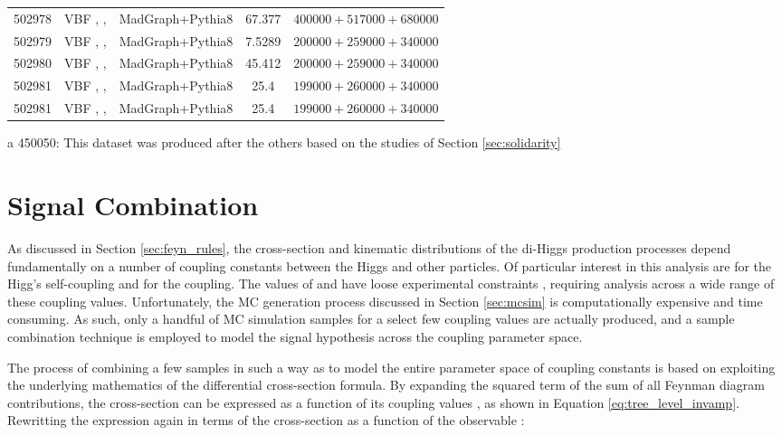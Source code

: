 \begin{table}[tbh]
\begin{center}
\begin{tabular}{lllSl}
               502978  &	VBF , ,    &  MadGraph+Pythia8 &	67.377  & $400000  +517000  +680000  $\\
               502979  &	VBF , ,   &  MadGraph+Pythia8 &	7.5289  & $200000  +259000  +340000  $\\
               502980  &	VBF , ,   &  MadGraph+Pythia8 &	45.412  & $200000  +259000  +340000  $\\
               502981  &	VBF , ,     &  MadGraph+Pythia8 &	25.4    & $199000  +260000  +340000  $\\
               502981  &	VBF , ,  &  MadGraph+Pythia8 &	25.4    & $199000  +260000  +340000  $\\ %
           \bottomrule
           \end{tabular}
           \begin{tablenotes}
            \item[a] 450050: This dataset was produced after the others based on the studies of Section \ref{sec:solidarity}
          \end{tablenotes}
       \end{center}
    \end{table}

\section{Signal Combination}

    As discussed in Section \ref{sec:feyn_rules}, the cross-section and kinematic distributions of the di-Higgs production processes depend fundamentally on a number of coupling constants between the Higgs and other particles.
    Of particular interest in this analysis are \kl for the Higg's self-coupling and \kvv for the \HHVV coupling.
    The values of \kl and \kvv have loose experimental constraints \cite{EXOT-2016-31} \cite{HDBS-2018-18-witherratum} \cite{ATLAS-CONF-2019-049},
        requiring analysis across a wide range of these coupling values.
    Unfortunately, the MC generation process discussed in Section \ref{sec:mcsim} is computationally expensive and time consuming.
    As such, only a handful of MC simulation samples for a select few coupling values are actually produced,
        and a sample combination technique is employed to model the signal hypothesis across the coupling parameter space.

    The process of combining a few samples in such a way as to model the entire parameter space of coupling constants is based on exploiting the underlying mathematics of the differential cross-section formula.
    By expanding the squared term of the sum of all Feynman diagram contributions,
        the cross-section can be expressed as a function of its coupling values \cite{ATLAS-CONF-2019-049}, as shown in Equation \ref{eq:tree_level_invamp}.
    Rewritting the expression again in terms of the cross-section as a function of the observable \mhh:

